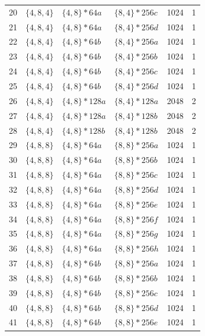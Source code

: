 \begin{longtable}{rllllr}
20 & \(\{4,8,4\}\) & \(\{4,8\}\!\ast 64a\) & \(\{8,4\}\!\ast 256c\) & 1024 & 1 \\
21 & \(\{4,8,4\}\) & \(\{4,8\}\!\ast 64a\) & \(\{8,4\}\!\ast 256d\) & 1024 & 1 \\
22 & \(\{4,8,4\}\) & \(\{4,8\}\!\ast 64b\) & \(\{8,4\}\!\ast 256a\) & 1024 & 1 \\
23 & \(\{4,8,4\}\) & \(\{4,8\}\!\ast 64b\) & \(\{8,4\}\!\ast 256b\) & 1024 & 1 \\
24 & \(\{4,8,4\}\) & \(\{4,8\}\!\ast 64b\) & \(\{8,4\}\!\ast 256c\) & 1024 & 1 \\
25 & \(\{4,8,4\}\) & \(\{4,8\}\!\ast 64b\) & \(\{8,4\}\!\ast 256d\) & 1024 & 1 \\
26 & \(\{4,8,4\}\) & \(\{4,8\}\!\ast 128a\) & \(\{8,4\}\!\ast 128a\) & 2048 & 2 \\
27 & \(\{4,8,4\}\) & \(\{4,8\}\!\ast 128a\) & \(\{8,4\}\!\ast 128b\) & 2048 & 2 \\
28 & \(\{4,8,4\}\) & \(\{4,8\}\!\ast 128b\) & \(\{8,4\}\!\ast 128b\) & 2048 & 2 \\
29 & \(\{4,8,8\}\) & \(\{4,8\}\!\ast 64a\) & \(\{8,8\}\!\ast 256a\) & 1024 & 1 \\
30 & \(\{4,8,8\}\) & \(\{4,8\}\!\ast 64a\) & \(\{8,8\}\!\ast 256b\) & 1024 & 1 \\
31 & \(\{4,8,8\}\) & \(\{4,8\}\!\ast 64a\) & \(\{8,8\}\!\ast 256c\) & 1024 & 1 \\
32 & \(\{4,8,8\}\) & \(\{4,8\}\!\ast 64a\) & \(\{8,8\}\!\ast 256d\) & 1024 & 1 \\
33 & \(\{4,8,8\}\) & \(\{4,8\}\!\ast 64a\) & \(\{8,8\}\!\ast 256e\) & 1024 & 1 \\
34 & \(\{4,8,8\}\) & \(\{4,8\}\!\ast 64a\) & \(\{8,8\}\!\ast 256f\) & 1024 & 1 \\
35 & \(\{4,8,8\}\) & \(\{4,8\}\!\ast 64a\) & \(\{8,8\}\!\ast 256g\) & 1024 & 1 \\
36 & \(\{4,8,8\}\) & \(\{4,8\}\!\ast 64a\) & \(\{8,8\}\!\ast 256h\) & 1024 & 1 \\
37 & \(\{4,8,8\}\) & \(\{4,8\}\!\ast 64b\) & \(\{8,8\}\!\ast 256a\) & 1024 & 1 \\
38 & \(\{4,8,8\}\) & \(\{4,8\}\!\ast 64b\) & \(\{8,8\}\!\ast 256b\) & 1024 & 1 \\
39 & \(\{4,8,8\}\) & \(\{4,8\}\!\ast 64b\) & \(\{8,8\}\!\ast 256c\) & 1024 & 1 \\
40 & \(\{4,8,8\}\) & \(\{4,8\}\!\ast 64b\) & \(\{8,8\}\!\ast 256d\) & 1024 & 1 \\
41 & \(\{4,8,8\}\) & \(\{4,8\}\!\ast 64b\) & \(\{8,8\}\!\ast 256e\) & 1024 & 1 \\

\end{longtable}
